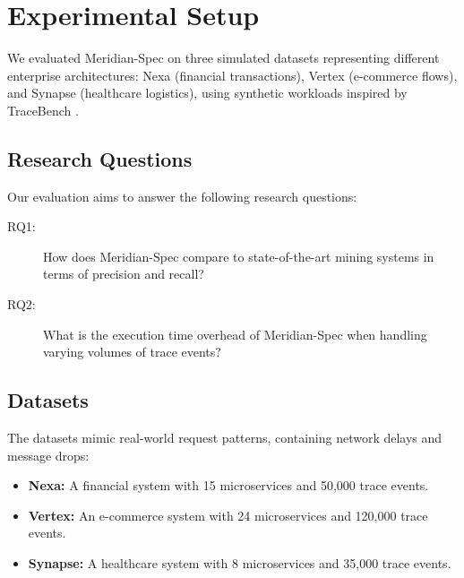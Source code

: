 \section{Experimental Setup}
We evaluated Meridian-Spec on three simulated datasets representing different enterprise architectures: Nexa (financial transactions), Vertex (e-commerce flows), and Synapse (healthcare logistics), using synthetic workloads inspired by TraceBench \cite{garcia2023tracebench}.

\subsection{Research Questions}
Our evaluation aims to answer the following research questions:
\begin{description}
  \item[RQ1:] How does Meridian-Spec compare to state-of-the-art mining systems in terms of precision and recall?
  \item[RQ2:] What is the execution time overhead of Meridian-Spec when handling varying volumes of trace events?
\end{description}

\subsection{Datasets}
The datasets mimic real-world request patterns, containing network delays and message drops:
\begin{itemize}
  \item \textbf{Nexa:} A financial system with 15 microservices and 50,000 trace events.
  \item \textbf{Vertex:} An e-commerce system with 24 microservices and 120,000 trace events.
  \item \textbf{Synapse:} A healthcare system with 8 microservices and 35,000 trace events.
\end{itemize}
